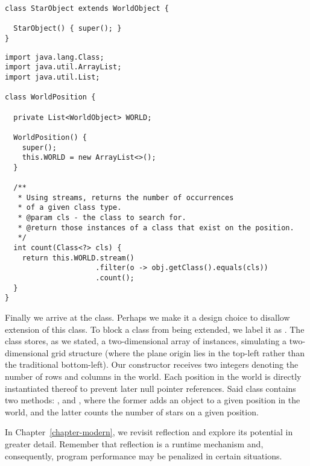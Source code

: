 \begin{lstlisting}[language=MyJava]
class StarObject extends WorldObject {
  
  StarObject() { super(); }
}
\end{lstlisting}


\begin{lstlisting}[language=MyJava]
import java.lang.Class;
import java.util.ArrayList;
import java.util.List;

class WorldPosition {

  private List<WorldObject> WORLD;

  WorldPosition() { 
    super(); 
    this.WORLD = new ArrayList<>();  
  }

  /**
   * Using streams, returns the number of occurrences 
   * of a given class type.
   * @param cls - the class to search for.
   * @return those instances of a class that exist on the position.
   */
  int count(Class<?> cls) {
    return this.WORLD.stream()
                     .filter(o -> obj.getClass().equals(cls))
                     .count();
  }
}
\end{lstlisting}

Finally we arrive at the  class. 
Perhaps we make it a design choice to disallow extension of this class. 
To block a class from being extended, we label it as . 
The  class stores, as we stated, a two-dimensional array of  instances, simulating a two-dimensional grid structure (where the plane origin lies in the top-left rather than the traditional bottom-left). 
Our constructor receives two integers denoting the number of rows and columns in the world. 
Each position in the world is directly instantiated thereof to prevent later null pointer references. 
Said  class contains two methods: , and , where the former adds an object to a given position in the world, and the latter counts the number of stars on a given position.

In Chapter~\ref{chapter-modern}, we revisit reflection and explore its potential in greater detail. 
Remember that reflection is a runtime mechanism and, consequently, program performance may be penalized in certain situations.

